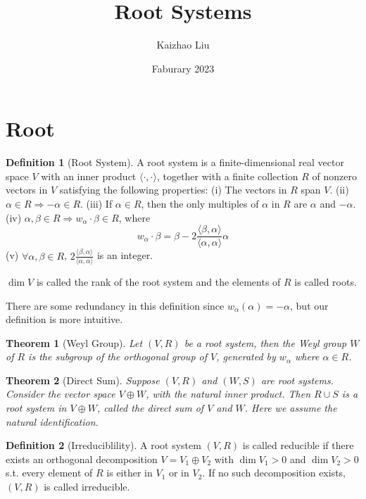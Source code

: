 \documentclass{article}
\title{Root Systems}
\author{Kaizhao Liu}
\date{Faburary 2023}
\newtheorem{theorem}{Theorem}[section]
\theoremstyle{definition}
\newtheorem{definition}{Definition}[section]
\begin{document}
\maketitle
\tableofcontents

\section{Root}
\begin{definition}[Root System]
    A root system is a finite-dimensional real vector space $V$ with an inner product $\langle\cdot,\cdot\rangle$,
    together with a finite collection $R$ of nonzero vectors in $V$ satisfying the following properties:\newline 
    (i) The vectors in $R$ span $V$.\newline 
    (ii) $\alpha\in R\Longrightarrow -\alpha\in R$.\newline
    (iii) If $\alpha\in R$, then the only multiples of $\alpha$ in $R$ are $\alpha$ and $-\alpha$.\newline 
    (iv) $\alpha,\beta\in R\Longrightarrow w_\alpha\cdot \beta\in R$, where 
    \[w_\alpha\cdot \beta=\beta-2\frac{\langle\beta,\alpha\rangle}{\langle\alpha,\alpha\rangle}\alpha\]
    (v) $\forall \alpha,\beta\in R$, $2\frac{\langle\beta,\alpha\rangle}{\langle\alpha,\alpha\rangle}$ is an integer.

    $\dim V$ is called the rank of the root system and the elements of $R$ is called roots.
\end{definition}
There are some redundancy in this definition since $w_\alpha(\alpha)=-\alpha$, but our definition is more intuitive.

\begin{theorem}[Weyl Group]
    Let $(V,R)$ be a root system, then the Weyl group $W$ of $R$ is the subgroup of the orthogonal group of $V$, 
    generated by $w_\alpha$ where $\alpha\in R$.
\end{theorem}

\begin{theorem}[Direct Sum]
    Suppose $(V,R)$ and $(W,S)$ are root systems. Consider the vector space $V\oplus W$, with the natural inner product.
    Then $R\cup S$ is a root system in $V\oplus W$, called the direct sum of $V$ and $W$. Here we assume the natural identification.
\end{theorem}

\begin{definition}[Irreduciblility]
    A root system $(V,R)$ is called reducible if there exists an orthogonal decomposition $V=V_1\oplus V_2$ with $\dim V_1>0$ and $\dim V_2>0$
    s.t. every element of $R$ is either in $V_1$ or in $V_2$. If no such decomposition exists, $(V,R)$ is called irreducible.
\end{definition}
\end{document}
